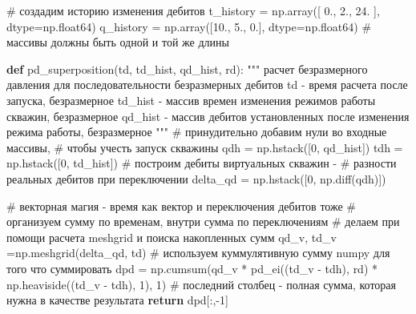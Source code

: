 \documentclass[
  russian,
  letterpaper,
  DIV=11,
  numbers=noendperiod,
  oneside]{scrartcl}
\newenvironment{Shaded}{\begin{snugshade}}{\end{snugshade}}
\newcommand{\CommentTok}[1]{\textcolor[rgb]{0.37,0.37,0.37}{#1}}
\newcommand{\ControlFlowTok}[1]{\textcolor[rgb]{0.00,0.23,0.31}{\textbf{#1}}}
\newcommand{\DecValTok}[1]{\textcolor[rgb]{0.68,0.00,0.00}{#1}}
\newcommand{\FloatTok}[1]{\textcolor[rgb]{0.68,0.00,0.00}{#1}}
\newcommand{\KeywordTok}[1]{\textcolor[rgb]{0.00,0.23,0.31}{\textbf{#1}}}
\newcommand{\NormalTok}[1]{\textcolor[rgb]{0.00,0.23,0.31}{#1}}
\newcommand{\OperatorTok}[1]{\textcolor[rgb]{0.37,0.37,0.37}{#1}}
\begin{document}
\begin{Shaded}
\begin{Highlighting}[]
\CommentTok{\# создадим историю изменения дебитов }
\NormalTok{t\_history }\OperatorTok{=}\NormalTok{ np.array([ }\FloatTok{0.}\NormalTok{, }\FloatTok{2.}\NormalTok{, }\FloatTok{24.}\NormalTok{ ], dtype}\OperatorTok{=}\NormalTok{np.float64) }
\NormalTok{q\_history }\OperatorTok{=}\NormalTok{ np.array([}\FloatTok{10.}\NormalTok{, }\FloatTok{5.}\NormalTok{, }\FloatTok{0.}\NormalTok{], dtype}\OperatorTok{=}\NormalTok{np.float64)}
\CommentTok{\# массивы должны быть одной и той же длины}

\KeywordTok{def}\NormalTok{ pd\_superposition(td, td\_hist, qd\_hist, rd):}
    \CommentTok{"""}
\CommentTok{    расчет безразмерного давления для последовательности }
\CommentTok{    безразмерных дебитов}
\CommentTok{    td {-}  время расчета после запуска, безразмерное}
\CommentTok{    td\_hist {-} массив времен изменения режимов работы скважин, безразмерное}
\CommentTok{    qd\_hist {-} массив дебитов установленных после изменения режима работы, }
\CommentTok{              безразмерное}
\CommentTok{    """}
    \CommentTok{\# принудительно добавим нули во входные массивы, }
    \CommentTok{\# чтобы учесть запуск скважины}
\NormalTok{    qdh }\OperatorTok{=}\NormalTok{ np.hstack([}\DecValTok{0}\NormalTok{, qd\_hist])}
\NormalTok{    tdh }\OperatorTok{=}\NormalTok{ np.hstack([}\DecValTok{0}\NormalTok{, td\_hist])}
    \CommentTok{\# построим дебиты виртуальных скважин {-} }
    \CommentTok{\# разности реальных дебитов при переключении}
\NormalTok{    delta\_qd }\OperatorTok{=}\NormalTok{ np.hstack([}\DecValTok{0}\NormalTok{, np.diff(qdh)])}
    
    \CommentTok{\# векторная магия {-} время как вектор и переключения дебитов тоже }
    \CommentTok{\# организуем сумму по временам, внутри сумма по переключениям}
    \CommentTok{\# делаем при помощи расчета meshgrid и поиска накопленных сумм}
\NormalTok{    qd\_v, td\_v }\OperatorTok{=}\NormalTok{np.meshgrid(delta\_qd, td)}
    \CommentTok{\# используем куммулятивную сумму numpy для того что суммировать }
\NormalTok{    dpd }\OperatorTok{=}\NormalTok{ np.cumsum(qd\_v }\OperatorTok{*}\NormalTok{ pd\_ei((td\_v }\OperatorTok{{-}}\NormalTok{ tdh), }
\NormalTok{                                 rd) }\OperatorTok{*}\NormalTok{ np.heaviside((td\_v }\OperatorTok{{-}}\NormalTok{ tdh), }\DecValTok{1}\NormalTok{), }\DecValTok{1}\NormalTok{)}
    \CommentTok{\# последний столбец {-} полная сумма, которая нужна в качестве результата}
    \ControlFlowTok{return}\NormalTok{ dpd[:,}\OperatorTok{{-}}\DecValTok{1}\NormalTok{]}


\end{Highlighting}
\end{Shaded}
\end{document}
